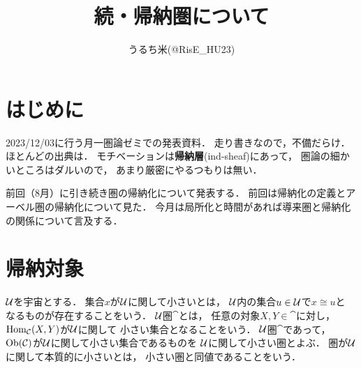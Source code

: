 





\def\inner<#1>{\langle #1 \rangle}
\def\ind<#1>{\mathop{\text{``}\hspace{-0.7pt}#1\limits\hspace{-1.5pt}\text{''}}}









\title{続・帰納圏について}
\author{うるち米(@RisE\_HU23)}
\date{}

\maketitle

\section*{はじめに}
2023/12/03に行う月一圏論ゼミでの発表資料．
走り書きなので，不備だらけ．
ほとんどの出典は\cite{KS01,KS06}．
モチベーションは\textbf{帰納層}(ind-sheaf)にあって，
圏論の細かいところはダルいので，
あまり厳密にやるつもりは無い．

前回（8月）に引き続き圏の帰納化について発表する．
前回は帰納化の定義とアーベル圏の帰納化について見た．
今月は局所化と時間があれば導来圏と帰納化の関係について言及する．


\section{帰納対象}

$\mathcal{U}$を宇宙とする．
集合$x$が$\mathcal{U}$に関して小さいとは，
$\mathcal{U}$内の集合$u\in\mathcal{U}$で$x\cong u$と
なるものが存在することをいう．
$\mathcal{U}$圏$\cat$とは，
任意の対象$X,Y\in\cat$に対し，$\mathop{\mathrm{Hom}}\nolimits_{\mathcal{C}}(X,Y)$が$\mathcal{U}$に関して
小さい集合となることをいう．
$\mathcal{U}$圏$\cat$であって，
$\mathop{\textrm{Ob}}\nolimits(\mathcal{C})$が$\mathcal{U}$に関して小さい集合であるものを
$\mathcal{U}$に関して小さい圏とよぶ．
圏が$\mathcal{U}$に関して本質的に小さいとは，
小さい圏と同値であることをいう．

